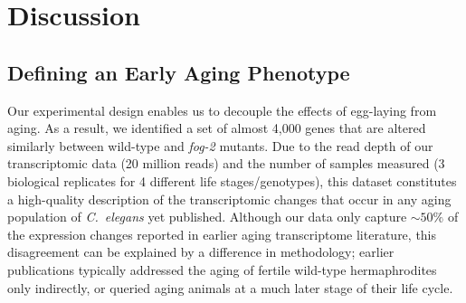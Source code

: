 \documentclass[10pt,letterpaper,twocolumn]{article}
\newcommand{\cel}{\emph{C.~elegans}}
\newcommand{\fog}{\emph{\mbox{fog-2}}}
\begin{document}
%
%
%

\section*{Discussion}
\label{sec:discussion}

\subsection*{Defining an Early Aging Phenotype}
\label{sub:Defining an Early Aging Phenotype}

Our experimental design enables us to decouple the effects of egg-laying from
aging. As a result, we identified a set of almost 4,000 genes that are altered
similarly between wild-type and \fog{} mutants. Due to the read depth of our
transcriptomic data (20 million reads) and the number of samples measured (3
biological replicates for 4 different life stages/genotypes), this dataset
constitutes a high-quality description of the transcriptomic changes that occur
in any aging population of \cel{} yet published.
Although our data only capture $\sim50\%$ of the expression changes reported
in earlier aging transcriptome literature, this disagreement can be explained
by a difference in methodology; earlier publications typically addressed the
aging of fertile wild-type hermaphrodites only indirectly, or queried aging
animals at a much later stage of their life cycle.
\end{document}
